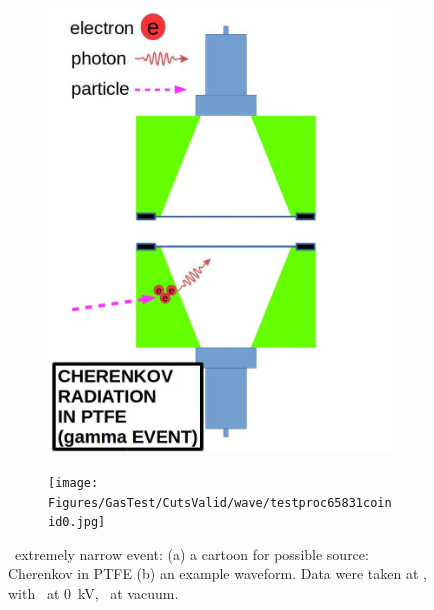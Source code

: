 \begin{figure}[!p]
	\centering
	\begin{subfigure}[b]{\halfwidth}
		\centering
		\includegraphics[width=\figurewidth,clip,trim={0 0 0 0},angle=0,origin=c]{Figures/GasTest/WeiDrawEvent/Cherenkov.jpg}
		\caption{}
		\label{fig:Chrenkov a}
	\end{subfigure}
	\begin{subfigure}[b]{\textwidth}
		\centering
		\texttt{[image: Figures/GasTest/CutsValid/wave/testproc65831coinid0.jpg]}
		\caption{}
		\label{fig:Chrenkov b}
	\end{subfigure}
	\caption[\gtest\ extremely narrow event]{\gtest\ extremely narrow event: (a) a cartoon for possible source: Cherenkov in PTFE (b) an example waveform. Data were taken at  , with \opvtvb\ at \SI{0}{\kV}, \opgd\ at vacuum.
}
	\label{fig:Chrenkov}
\end{figure}

